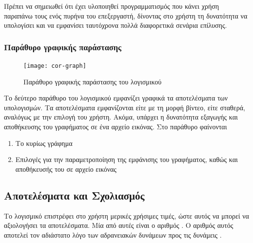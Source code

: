 Πρέπει να σημειωθεί ότι έχει υλοποιηθεί προγραμματισμός που κάνει χρήση παραπάνω τους ενός πυρήνα του επεξεργαστή, δίνοντας στο χρήστη τη δυνατότητα να υπολογίσει και να εμφανίσει ταυτόχρονα πολλά διαφορετικά σενάρια επίλυσης.

\subsubsection{Παράθυρο γραφικής παράστασης}
\begin{figure}
\label{fig:cor-graph}
\centering
\texttt{[image: cor-graph]}
\caption{Παράθυρο γραφικής παράστασης του λογισμικού }
\end{figure}
Το δεύτερο παράθυρο του λογισμικού εμφανίζει γραφικά τα αποτελέσματα των υπολογισμών. Τα αποτελέσματα εμφανίζονται είτε με τη μορφή βίντεο, είτε σταθερά, αναλόγως με την επιλογή του χρήστη. Ακόμα, υπάρχει η δυνατότητα εξαγωγής και αποθήκευσης του γραφήματος σε ένα αρχείο εικόνας. Στο παράθυρο φαίνονται
\begin{enumerate}
\item Το κυρίως γράφημα
\item Επιλογές για την παραμετροποίηση της εμφάνισης του γραφήματος, καθώς και αποθήκευσής του σε αρχείο εικόνας
\end{enumerate}

\subsection{Αποτελέσματα και Σχολιασμός}
Το λογισμικό επιστρέφει στο χρήστη μερικές χρήσιμες τιμές, ώστε αυτός να μπορεί να αξιολογήσει τα αποτελέσματα. Μία από αυτές είναι ο αριθμός \ros. Ο αριθμός αυτός αποτελεί τον αδιάστατο λόγο των αδρανειακών δυνάμεων προς τις δυνάμεις . 

